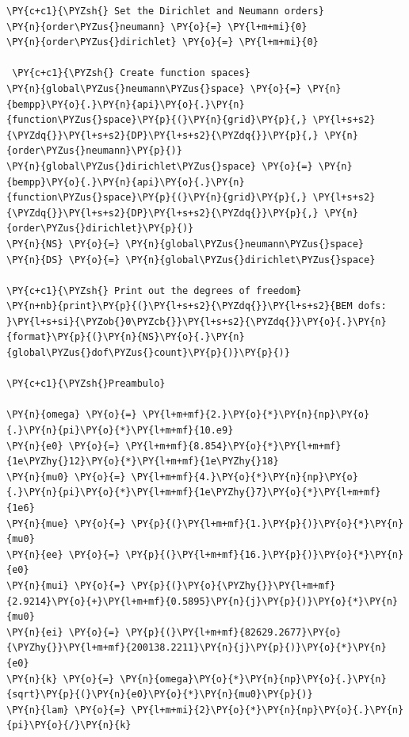 \begin{tcolorbox}
\begin{Verbatim}[commandchars=\\\{\}]
\PY{c+c1}{\PYZsh{} Set the Dirichlet and Neumann orders}
\PY{n}{order\PYZus{}neumann} \PY{o}{=} \PY{l+m+mi}{0}
\PY{n}{order\PYZus{}dirichlet} \PY{o}{=} \PY{l+m+mi}{0}
 
 \PY{c+c1}{\PYZsh{} Create function spaces}       
\PY{n}{global\PYZus{}neumann\PYZus{}space} \PY{o}{=} \PY{n}{bempp}\PY{o}{.}\PY{n}{api}\PY{o}{.}\PY{n}{function\PYZus{}space}\PY{p}{(}\PY{n}{grid}\PY{p}{,} \PY{l+s+s2}{\PYZdq{}}\PY{l+s+s2}{DP}\PY{l+s+s2}{\PYZdq{}}\PY{p}{,} \PY{n}{order\PYZus{}neumann}\PY{p}{)}
\PY{n}{global\PYZus{}dirichlet\PYZus{}space} \PY{o}{=} \PY{n}{bempp}\PY{o}{.}\PY{n}{api}\PY{o}{.}\PY{n}{function\PYZus{}space}\PY{p}{(}\PY{n}{grid}\PY{p}{,} \PY{l+s+s2}{\PYZdq{}}\PY{l+s+s2}{DP}\PY{l+s+s2}{\PYZdq{}}\PY{p}{,} \PY{n}{order\PYZus{}dirichlet}\PY{p}{)}   
\PY{n}{NS} \PY{o}{=} \PY{n}{global\PYZus{}neumann\PYZus{}space}
\PY{n}{DS} \PY{o}{=} \PY{n}{global\PYZus{}dirichlet\PYZus{}space}

\PY{c+c1}{\PYZsh{} Print out the degrees of freedom}        
\PY{n+nb}{print}\PY{p}{(}\PY{l+s+s2}{\PYZdq{}}\PY{l+s+s2}{BEM dofs: }\PY{l+s+si}{\PYZob{}0\PYZcb{}}\PY{l+s+s2}{\PYZdq{}}\PY{o}{.}\PY{n}{format}\PY{p}{(}\PY{n}{NS}\PY{o}{.}\PY{n}{global\PYZus{}dof\PYZus{}count}\PY{p}{)}\PY{p}{)}

\PY{c+c1}{\PYZsh{}Preambulo}

\PY{n}{omega} \PY{o}{=} \PY{l+m+mf}{2.}\PY{o}{*}\PY{n}{np}\PY{o}{.}\PY{n}{pi}\PY{o}{*}\PY{l+m+mf}{10.e9}
\PY{n}{e0} \PY{o}{=} \PY{l+m+mf}{8.854}\PY{o}{*}\PY{l+m+mf}{1e\PYZhy{}12}\PY{o}{*}\PY{l+m+mf}{1e\PYZhy{}18}
\PY{n}{mu0} \PY{o}{=} \PY{l+m+mf}{4.}\PY{o}{*}\PY{n}{np}\PY{o}{.}\PY{n}{pi}\PY{o}{*}\PY{l+m+mf}{1e\PYZhy{}7}\PY{o}{*}\PY{l+m+mf}{1e6}
\PY{n}{mue} \PY{o}{=} \PY{p}{(}\PY{l+m+mf}{1.}\PY{p}{)}\PY{o}{*}\PY{n}{mu0}
\PY{n}{ee} \PY{o}{=} \PY{p}{(}\PY{l+m+mf}{16.}\PY{p}{)}\PY{o}{*}\PY{n}{e0}
\PY{n}{mui} \PY{o}{=} \PY{p}{(}\PY{o}{\PYZhy{}}\PY{l+m+mf}{2.9214}\PY{o}{+}\PY{l+m+mf}{0.5895}\PY{n}{j}\PY{p}{)}\PY{o}{*}\PY{n}{mu0}
\PY{n}{ei} \PY{o}{=} \PY{p}{(}\PY{l+m+mf}{82629.2677}\PY{o}{\PYZhy{}}\PY{l+m+mf}{200138.2211}\PY{n}{j}\PY{p}{)}\PY{o}{*}\PY{n}{e0}
\PY{n}{k} \PY{o}{=} \PY{n}{omega}\PY{o}{*}\PY{n}{np}\PY{o}{.}\PY{n}{sqrt}\PY{p}{(}\PY{n}{e0}\PY{o}{*}\PY{n}{mu0}\PY{p}{)}
\PY{n}{lam} \PY{o}{=} \PY{l+m+mi}{2}\PY{o}{*}\PY{n}{np}\PY{o}{.}\PY{n}{pi}\PY{o}{/}\PY{n}{k}
\end{Verbatim}
\end{tcolorbox}
